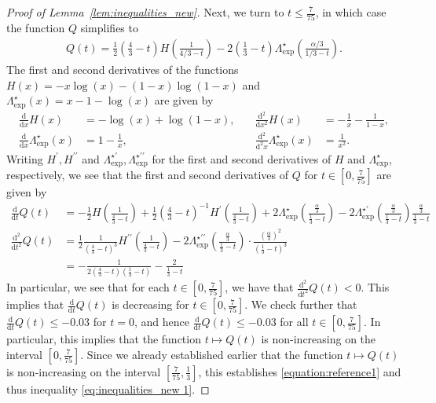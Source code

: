\documentclass[11pt]{article}
\numberwithin{equation}{section}
\newcommand{\dd}{\mathrm d}
\theoremstyle{definition}
\begin{document}
\begin{proof}[Proof of Lemma~\ref{lem:inequalities_new}]
Next, we turn to $t\leq \frac{7}{75}$, in which case the function $Q$ simplifies to
\begin{align*}
    Q(t) = \frac{1}{2}\left( \frac{4}{3} - t \right) 
    H\left(\frac{1}{4/3 - t}\right) -  2 \left( \frac{1}{3} - t \right) \Lambda^{\star}_{\exp} \left(\frac{\alpha/3}{1/3 - t} \right) .
\end{align*}
The first and second derivatives of the functions $H(x)=-x \log(x) - (1-x) \log(1-x)$ and $\Lambda_{\exp}^\star(x)=x-1-\log(x)$ are given by
\begin{align*}
    \frac{\dd}{\dd x} H(x) &= - \log(x) + \log(1-x) , 
    &\quad
    \frac{\dd^2}{\dd x^2} H(x) &= -\frac{1}{x} - \frac{1}{1-x}, 
    \\
    \frac{\dd}{\dd x} \Lambda_{\exp}^\star(x) &= 1 - \frac{1}{x} , 
    &\quad
    \frac{\dd^2}{\dd^2 x} \Lambda_{\exp}^\star(x) &= \frac{1}{x^2}.
\end{align*}
Writing $H^\prime, H^{\prime \prime}$ and $\Lambda_{\exp}^{\star\prime}, \Lambda_{\exp}^{\star\prime\prime}$ for the first and second derivatives of $H$ and $\Lambda_{\exp}^{\star}$, respectively, we see that the first and second derivatives of $Q$ for $t\in \left[0,\frac{7}{75}\right]$ are given by
\begin{align*}
    \frac{\dd}{\dd t} Q(t) & = - \frac{1}{2} H \left( \frac{1}{\frac{4}{3}-t} \right) 
    + 
    \frac{1}{2} \left( \frac{4}{3}-t \right)^{-1} H^\prime \left( \frac{1}{\frac{4}{3}-t} \right)
    +
    2 \Lambda_{\exp}^{\star} \left( \frac{\frac{\alpha}{3}}{\frac{1}{3}-t} \right) 
    - 
    2 \Lambda_{\exp}^{\star \prime} \left( \frac{\frac{\alpha}{3}}{\frac{1}{3}-t} \right) \frac{\frac{\alpha}{3}}{\frac{1}{3}-t}
    \\
    \frac{\dd^2}{\dd t^2} Q(t) & = \frac{1}{2} \frac{1}{\left( \frac{4}{3}-t \right)^3} H^{\prime\prime} \left(\frac{1}{\frac{4}{3}-t}\right)-2\Lambda_{\exp}^{\star\prime\prime} \left(\frac{\frac{\alpha}{3}}{\frac{1}{3}-t}\right)\cdot\frac{\left(\frac{\alpha}{3}\right)^{2}}{\left(\frac{1}{3}-t\right)^{3}}
    \\
    &
    = -\frac{1}{2\left(\frac{4}{3}-t\right) \left( \frac{1}{3}-t \right)} 
    -\frac{2}{\frac{1}{3}-t}
\end{align*} 
In particular, we see that for each $t \in \left[0,\frac{7}{75} \right]$, we have that 
$\frac{\dd^2}{\dd t^2} Q(t) < 0$. 
This implies that 
$\frac{\dd}{\dd t} Q(t)$ 
is decreasing for $t \in \left[0,\frac{7}{75} \right]$. 
We check further that 
$\frac{\dd}{\dd t} Q(t) \leq -0.03$ for $t = 0$, 
and hence 
$\frac{\dd}{\dd t} Q(t) \leq -0.03$ for all $t \in \left[0,\frac{7}{75} \right]$. 
In particular, this implies that the function $t \mapsto Q(t)$ is non-increasing on the interval $\left[0,\frac{7}{75}\right]$. Since we already established earlier that the function $t \mapsto Q(t)$ is non-increasing on the interval $\left[\frac{7}{75},\frac{1}{3}\right]$, this establishes \eqref{equation:reference1} and thus inequality \eqref{eq:inequalities_new 1}.



\end{proof}
\end{document}
